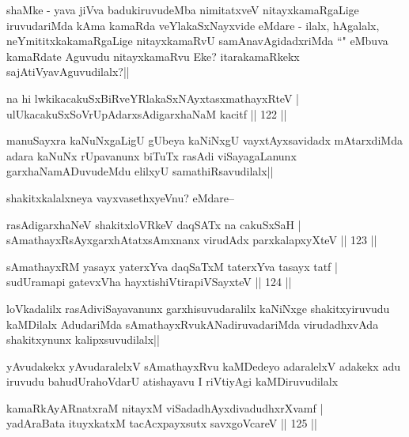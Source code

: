 \begin{artha}
shaMke - yava jiVva badukiruvudeMba nimitatxveV nitayxkamaRgaLige iruvudariMda kAma kamaRda veYlakaSxNayxvide eMdare - ilalx, hAgalalx, neYmititxkakamaRgaLige nitayxkamaRvU samAnavAgidadxriMda ``\stext" eMbuva kamaRdate Aguvudu nitayxkamaRvu Eke? itarakamaRkekx sajAtiVyavAguvudilalx?|| 
\end{artha}

\begin{shl}
na hi lwkikacakuSxBiRveYRlakaSxNAyxtasxmathayxRteV |\\
ulUkacakuSxSoV\s rUpAdarxsAdigarxhaNaM kacitf \hfill || 122 ||
\end{shl}

\begin{artha}
manuSayxra kaNuNxgaLigU gUbeya kaNiNxgU vayxtAyxsavidadx mAtarxdiMda adara kaNuNx rUpavanunx biTuTx rasAdi viSayagaLanunx garxhaNamADuvudeMdu elilxyU samathiRsavudilalx||
\end{artha}

\begin{artha}
shakitxkalalxneya vayxvasethxyeVnu? eMdare--
\end{artha}

\begin{shl}
rasAdigarxhaNeV shakitxloVRkeV daqSATx na cakuSxSaH |\\
sAmathayxRsAyxgarxhAtatxsAmxnanx virudAdx parxkalapxyXteV \hfill || 123 ||
\end{shl}

\begin{shl}
sAmathayxRM yasayx yaterxYva daqSaTxM taterxYva tasayx tatf |\\
sudUramapi gatevxVha hayxtishiVtirapiVSayxteV \hfill || 124 ||
\end{shl}

\begin{artha}
loVkadalilx rasAdiviSayavanunx garxhisuvudaralilx kaNiNxge shakitxyiruvudu kaMDilalx AdudariMda sAmathayxRvukANadiruvadariMda virudadhxvAda shakitxynunx kalipxsuvudilalx||
\end{artha}

\begin{artha}
yAvudakekx yAvudaralelxV sAmathayxRvu kaMDedeyo adaralelxV adakekx adu iruvudu bahudUrahoVdarU atishayavu I riVtiyAgi kaMDiruvudilalx
\end{artha}

\begin{shl}
kamaRkAyARnatxraM nitayxM viSadadhAyxdivadudhxrXvamf |\\
yadAraBata ituyxkatxM tacAcxpayxsutx savxgoVcareV \hfill || 125 ||
\end{shl}

